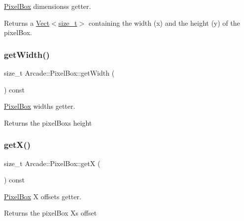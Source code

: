 \hyperlink{class_arcade_1_1_pixel_box}{Pixel\+Box} dimensions\textquotesingle{}s getter. 

\begin{DoxyReturn}{Returns}
a \hyperlink{class_arcade_1_1_vect}{Vect$<$size\+\_\+t$>$} containing the width (x) and the height (y) of the pixel\+Box. 
\end{DoxyReturn}
\mbox{\label{class_arcade_1_1_pixel_box_a004ea9244a8ebc163c1e3fa06bdf8c4a}} 
\subsubsection{\texorpdfstring{get\+Width()}{getWidth()}}
{\footnotesize\ttfamily size\+\_\+t Arcade\+::\+Pixel\+Box\+::get\+Width (\begin{DoxyParamCaption}{ }\end{DoxyParamCaption}) const}



\hyperlink{class_arcade_1_1_pixel_box}{Pixel\+Box} width\textquotesingle{}s getter. 

\begin{DoxyReturn}{Returns}
the pixel\+Box\textquotesingle{}s height 
\end{DoxyReturn}
\mbox{\label{class_arcade_1_1_pixel_box_a17c96dac5f262348f15627705fdb1db6}} 
\subsubsection{\texorpdfstring{get\+X()}{getX()}}
{\footnotesize\ttfamily size\+\_\+t Arcade\+::\+Pixel\+Box\+::getX (\begin{DoxyParamCaption}{ }\end{DoxyParamCaption}) const}



\hyperlink{class_arcade_1_1_pixel_box}{Pixel\+Box} X offset\textquotesingle{}s getter. 

\begin{DoxyReturn}{Returns}
the pixel\+Box X\textquotesingle{}s offset 
\end{DoxyReturn}
\mbox{\label{class_arcade_1_1_pixel_box_a67b98640d591223f1e898d8d8158ab48}} 
